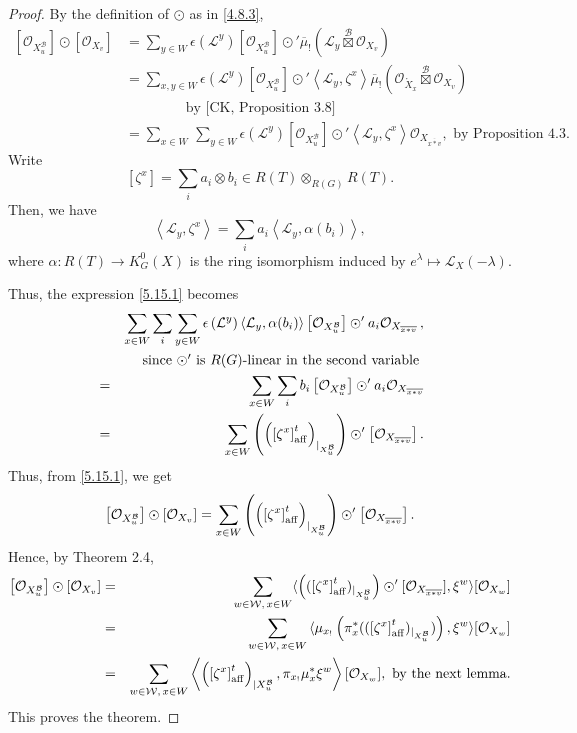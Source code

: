 \documentclass{article}
\def\L{\mathcal{L}}
\def\B{\mathcal{B}}
\def\W{\mathcal{W}}
\def\ref#1{#1}
\def\aff{\rm{aff}}
\begin{document}
\begin{proof}
By the definition of $\odot$ as in \eqref{4.8.3}, 
\begin{align}\label{5.15.1}
\left[\mathcal{O}_{X_u^\B}\right]\odot\left[\mathcal{O}_{X_v}\right] &= \sum_{y\in W} \epsilon \left(\L^y\right) \left[\mathcal{O}_{X_u^\B}\right]\odot'\overline{\mu}_!\left(\L_y \overset{\B}{\boxtimes} \mathcal{O}_{X_v}\right)\nonumber\\
&=\sum_{x,y\in W} \epsilon \left(\L^y\right) \left[\mathcal{O}_{X_u^\B}\right]\odot'\left\langle \L_y,\zeta^x\right\rangle \overline{\mu}_! \left( \mathcal{O}_{\mathring{X}_x}\overset{\B}{\boxtimes}\mathcal{O}_{X_v}\right) \nonumber\\
&\qquad \qquad \mbox{ by [CK, Proposition 3.8]}\nonumber\\
&= \sum_{x\in W}\, \sum_{y\in W} \epsilon\left(\L^y\right)  \left[\mathcal{O}_{X_u^\B}\right]\odot'\left\langle \L_y,\zeta^x\right\rangle \mathcal{O}_{X_{\overline{x*v}}},
\mbox{  by Proposition \ref{4.3}.}
\end{align}
Write 
$$
\left[\zeta^x\right] = \sum_i a_i \otimes b_i \in R(T) \otimes _{R(G)} R(T).
$$
Then, we have 
$$
\left\langle \L_y,\zeta^x\right\rangle =  \sum_i a_i\left\langle \L_y,\alpha(b_i) \right\rangle,
$$
where $\alpha:R(T)\rightarrow K_G^0(X)$ is the ring isomorphism induced by $e^\lambda\mapsto\L_X(-\lambda)$. 

Thus, the expression \eqref{5.15.1} becomes 
\begin{eqnarray*}
&&\sum_{x\in W}\sum_i\sum_{y\in W} \epsilon  \left(\L^y\right)
\langle \L_y, \alpha(b_i)\rangle  \left[\mathcal{O}_{X_u^\B}\right]\odot' a_i\mathcal{O}_{X_{\overline{x*v}}} \,,\\
&&\mbox{since $\odot'$ is $R(G)$-linear in the second variable }\\
&=&\sum_{x\in W}\sum_i b_i\left[\mathcal{O}_{X_u^\B}\right] \odot' a_i \mathcal{O}_{X_{\overline{x*v}}} \\
&=&\sum_{x\in W} \left( \left(\left[ \zeta^x\right]^t_{\aff}\right)_{|_{X_u^\B}}\right) \odot' \left[\mathcal{O}_{X_{\overline{x*v}}}\right].
\end{eqnarray*}
Thus, from \eqref{5.15.1}, we get 
$$
\left[\mathcal{O}_{X_u^\B}\right]\odot \left[\mathcal{O}_{X_v}\right] = \sum_{x\in W}\left( \left(\left[ \zeta^x\right]^t_{\aff}\right)_{|_{X_u^\B}}\right) \odot' \left[\mathcal{O}_{X_{\overline{x*v}}}\right].
$$
Hence, by Theorem \ref{2.4},
\begin{eqnarray*}
\left[\mathcal{O}_{X_u^\B}\right]\odot \left[\mathcal{O}_{X_v}\right] &=& \sum_{w\in \W, \, x\in W}\langle \left((\left[ \zeta^x\right]^t_{\aff})_{|_{X_u^\B}}\right) \odot' [\mathcal{O}_{X_{\overline{x*v}}}], 
\xi^w\rangle [\mathcal{O}_{X_w}]\\
&=&\sum_{w\in \W,\, x\in W}\, \langle\mu_{x_!}\left(\pi_x^*((\left[ \zeta^x\right]^t_{\aff})_{|_{X_u^\B}})\right),\xi^w \rangle [  \mathcal{O}_{X_w}]
\\
&=& \sum_{w\in \W, \, x\in W}\left\langle \left(\left[ \zeta^x\right]^t_{\aff}\right)_{|X_u^\B}, \pi_{x_!} \mu_x^* \xi^w \right\rangle  [\mathcal{O}_{X_w}],
 \mbox{ by the next lemma.}
\end{eqnarray*}
 This proves the theorem. 
\end{proof}
\end{document}
